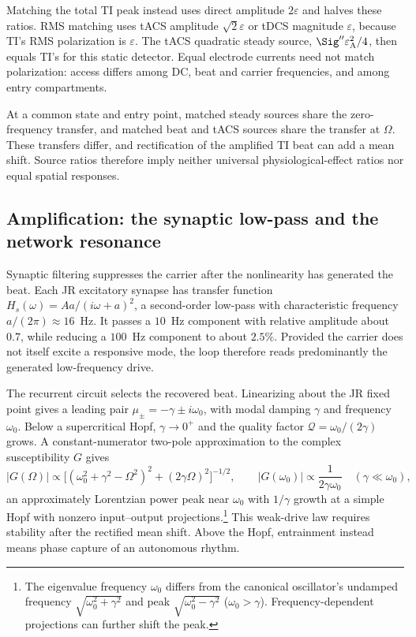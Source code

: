 Matching the total TI peak instead uses direct amplitude $2\varepsilon$
and halves these ratios. RMS matching uses tACS amplitude
$\sqrt2\varepsilon$ or tDCS magnitude $\varepsilon$, because TI's RMS
polarization is $\varepsilon$. The tACS quadratic steady source,
$\Sig''\varepsilon_{\rm A}^2/4$, then equals TI's for this static detector.
Equal electrode currents need not match polarization: access differs among
DC, beat and carrier frequencies, and among entry compartments.

At a common state and entry point, matched steady sources share the
zero-frequency transfer, and matched beat and tACS sources share the transfer
at $\Omega$. These transfers differ, and rectification of the amplified TI
beat can add a mean shift.
Source ratios therefore imply neither universal physiological-effect ratios
nor equal spatial responses.

\subsection{Amplification: the synaptic low-pass and the network resonance}\label{sec:carrier}
Synaptic filtering suppresses the carrier after the nonlinearity has generated
the beat. Each JR excitatory synapse has transfer function
$H_s(\omega)=Aa/(i\omega+a)^2$, a second-order low-pass with characteristic
frequency $a/(2\pi)\approx16$~Hz. It passes a $10$~Hz component with relative
amplitude about $0.7$, while reducing a $100$~Hz component to about $2.5\%$. Provided the carrier does not itself excite a responsive
mode, the loop therefore reads predominantly the generated low-frequency drive.


The recurrent circuit selects the recovered beat. Linearizing about the JR
fixed point gives a leading pair $\mu_\pm=-\gamma\pm i\omega_0$, with
modal damping $\gamma$ and frequency $\omega_0$. Below a supercritical
Hopf, $\gamma\to0^+$ and the quality factor
$\mathcal Q=\omega_0/(2\gamma)$ grows. A constant-numerator two-pole
approximation to the complex susceptibility $G$ gives
\begin{equation}
|G(\Omega)|\propto\big[(\omega_0^2+\gamma^2-\Omega^2)^2+(2\gamma\Omega)^2\big]^{-1/2},
\qquad |G(\omega_0)|\propto\frac{1}{2\gamma\omega_0}
\quad(\gamma\ll\omega_0),
\label{eq:gain}
\end{equation}
an approximately Lorentzian power peak near $\omega_0$ with $1/\gamma$
growth at a simple Hopf with nonzero input--output projections.\footnote{
The eigenvalue frequency $\omega_0$ differs from the canonical oscillator's
undamped frequency $\sqrt{\omega_0^2+\gamma^2}$ and peak
$\sqrt{\omega_0^2-\gamma^2}$ ($\omega_0>\gamma$).
Frequency-dependent projections can further shift the peak.}
This weak-drive law requires stability after the rectified mean shift.
Above the Hopf, entrainment instead means phase capture of an autonomous rhythm.

